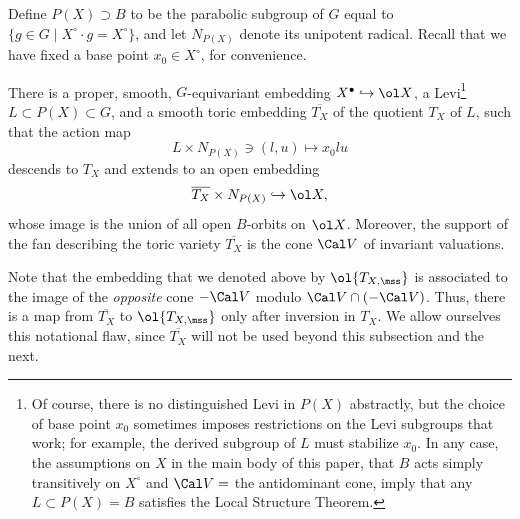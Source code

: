 Define $P(X) \supset B$ to be the parabolic subgroup of $G$ equal to
$\{ g \in G \mid X^\circ \cdot g = X^\circ \}$, and let $N_{P(X)}$ denote its unipotent radical. Recall that we have fixed a base point $x_0\in X^\circ$, for convenience.

\begin{thm}
\notready\label{thm:localstructure}
 There is a proper, smooth, $G$-equivariant embedding $X^\bullet \hookrightarrow \ol X$, a Levi\footnote{Of course, there is no distinguished Levi in $P(X)$ abstractly, but the choice of base point $x_0$ sometimes imposes restrictions on the Levi subgroups that work; for example, the derived subgroup of $L$ must stabilize $x_0$. In any case, the assumptions on $X$ in the main body of this paper, that $B$ acts simply transitively on $X^\circ$ and $\Cal V=$ the antidominant cone, imply that any $L\subset P(X)= B$ satisfies the Local Structure Theorem.} $L \subset P(X) \subset G$,  and a smooth toric embedding $\overline{T_X}$ of the quotient $T_X$ of $L$, such that the action map
 \[ L \times N_{P(X)} \ni (l, u) \mapsto x_0 lu\]
 descends to $T_X$ and extends to an open embedding
 \[ \overline{T_X} \times N_{P(X)} \hookrightarrow \ol X,\]
 whose image is the union of all open $B$-orbits on $\ol X$. Moreover, the support of the fan describing the toric variety $\overline{T_X}$ is the cone $\Cal V$ of invariant valuations.
\end{thm}

\begin{rem}
\notready
 Note that the embedding that we denoted above by $\ol{T_{X,\mss}}$ is associated to the image of the \emph{opposite} cone $-\Cal V$ modulo $\Cal V\cap (-\Cal V)$. Thus, there is a map from $\overline{T_X}$ to $\ol{T_{X,\mss}}$ only after inversion in $T_X$. We allow ourselves this notational flaw, since $\overline{T_X}$ will not be used beyond this subsection and the next.
\end{rem}


